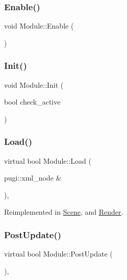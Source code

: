 \subsubsection{\texorpdfstring{Enable()}{Enable()}}
{\footnotesize\ttfamily void Module\+::\+Enable (\begin{DoxyParamCaption}{ }\end{DoxyParamCaption})\hspace{0.3cm}{\ttfamily [inline]}}

\mbox{\label{class_module_ad755410a1c48d3e6dc755c4ebd29f348}} 
\subsubsection{\texorpdfstring{Init()}{Init()}}
{\footnotesize\ttfamily void Module\+::\+Init (\begin{DoxyParamCaption}\item[{bool}]{check\+\_\+active }\end{DoxyParamCaption})\hspace{0.3cm}{\ttfamily [inline]}}

\mbox{\label{class_module_adf4ae9320f5f244c47b472348fb3c1f9}} 
\subsubsection{\texorpdfstring{Load()}{Load()}}
{\footnotesize\ttfamily virtual bool Module\+::\+Load (\begin{DoxyParamCaption}\item[{pugi\+::xml\+\_\+node \&}]{ }\end{DoxyParamCaption})\hspace{0.3cm}{\ttfamily [inline]}, {\ttfamily [virtual]}}



Reimplemented in \mbox{\hyperlink{class_scene_aabbd7af9c75ded5b555170426259699e}{Scene}}, and \mbox{\hyperlink{class_render_a47a72b2f12ff4a24eb4bf98d9b617434}{Render}}.

\mbox{\label{class_module_afc355df351a4483850c3f512823ceebd}} 
\subsubsection{\texorpdfstring{PostUpdate()}{PostUpdate()}}
{\footnotesize\ttfamily virtual bool Module\+::\+Post\+Update (\begin{DoxyParamCaption}{ }\end{DoxyParamCaption})\hspace{0.3cm}{\ttfamily [inline]}, {\ttfamily [virtual]}}



